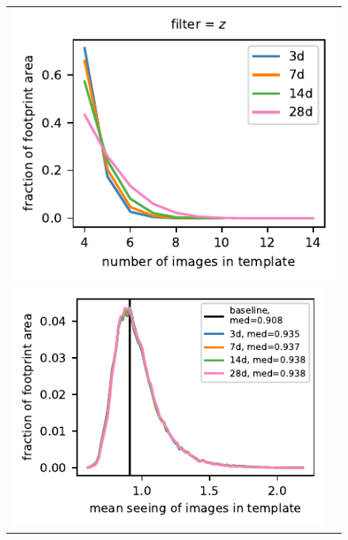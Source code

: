 \documentclass[preprintm,linenumbers]{aastex631}
\begin{document}
   \begin{figure}[h]
			\centering
%				
%				
		
					\begin{tabular}{@{}c@{}c@{}}
			\multicolumn{2}{c}{\includegraphics{results/histograms_templates_tscale/hist_first_year_one_snap_v4_0_10yrs_db_noDD_noTwi_doALLTemplateMetrics_reduceNTemplate_z_noDD_noTwi.pdf}} \\
					\includegraphics{results/histograms_templates_tscale/hist_first_year_one_snap_v4_0_10yrs_db_noDD_noTwi_doALLTemplateMetrics_reduceSeeingTemplate_z_noDD_noTwi.pdf} &

\end{tabular}
\end{figure}
\end{document}

